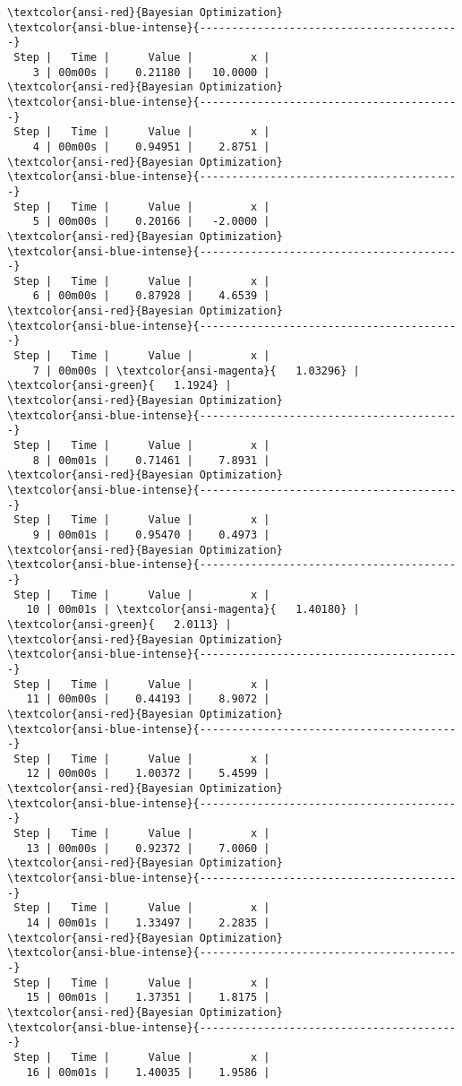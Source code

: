 \documentclass[11pt]{article}
\begin{document}
    \begin{Verbatim}[commandchars=\\\{\}]
\textcolor{ansi-red}{Bayesian Optimization}
\textcolor{ansi-blue-intense}{-----------------------------------------}
 Step |   Time |      Value |         x | 
    3 | 00m00s |    0.21180 |   10.0000 | 
\textcolor{ansi-red}{Bayesian Optimization}
\textcolor{ansi-blue-intense}{-----------------------------------------}
 Step |   Time |      Value |         x | 
    4 | 00m00s |    0.94951 |    2.8751 | 
\textcolor{ansi-red}{Bayesian Optimization}
\textcolor{ansi-blue-intense}{-----------------------------------------}
 Step |   Time |      Value |         x | 
    5 | 00m00s |    0.20166 |   -2.0000 | 
\textcolor{ansi-red}{Bayesian Optimization}
\textcolor{ansi-blue-intense}{-----------------------------------------}
 Step |   Time |      Value |         x | 
    6 | 00m00s |    0.87928 |    4.6539 | 
\textcolor{ansi-red}{Bayesian Optimization}
\textcolor{ansi-blue-intense}{-----------------------------------------}
 Step |   Time |      Value |         x | 
    7 | 00m00s | \textcolor{ansi-magenta}{   1.03296} | \textcolor{ansi-green}{   1.1924} | 
\textcolor{ansi-red}{Bayesian Optimization}
\textcolor{ansi-blue-intense}{-----------------------------------------}
 Step |   Time |      Value |         x | 
    8 | 00m01s |    0.71461 |    7.8931 | 
\textcolor{ansi-red}{Bayesian Optimization}
\textcolor{ansi-blue-intense}{-----------------------------------------}
 Step |   Time |      Value |         x | 
    9 | 00m01s |    0.95470 |    0.4973 | 
\textcolor{ansi-red}{Bayesian Optimization}
\textcolor{ansi-blue-intense}{-----------------------------------------}
 Step |   Time |      Value |         x | 
   10 | 00m01s | \textcolor{ansi-magenta}{   1.40180} | \textcolor{ansi-green}{   2.0113} | 
\textcolor{ansi-red}{Bayesian Optimization}
\textcolor{ansi-blue-intense}{-----------------------------------------}
 Step |   Time |      Value |         x | 
   11 | 00m00s |    0.44193 |    8.9072 | 
\textcolor{ansi-red}{Bayesian Optimization}
\textcolor{ansi-blue-intense}{-----------------------------------------}
 Step |   Time |      Value |         x | 
   12 | 00m00s |    1.00372 |    5.4599 | 
\textcolor{ansi-red}{Bayesian Optimization}
\textcolor{ansi-blue-intense}{-----------------------------------------}
 Step |   Time |      Value |         x | 
   13 | 00m00s |    0.92372 |    7.0060 | 
\textcolor{ansi-red}{Bayesian Optimization}
\textcolor{ansi-blue-intense}{-----------------------------------------}
 Step |   Time |      Value |         x | 
   14 | 00m01s |    1.33497 |    2.2835 | 
\textcolor{ansi-red}{Bayesian Optimization}
\textcolor{ansi-blue-intense}{-----------------------------------------}
 Step |   Time |      Value |         x | 
   15 | 00m01s |    1.37351 |    1.8175 | 
\textcolor{ansi-red}{Bayesian Optimization}
\textcolor{ansi-blue-intense}{-----------------------------------------}
 Step |   Time |      Value |         x | 
   16 | 00m01s |    1.40035 |    1.9586 | 

    \end{Verbatim}
\end{document}
